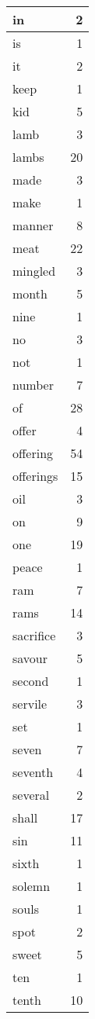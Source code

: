 \begin{center}
\begin{longtable}{l|r}
in & 2\\ \hline 
is & 1\\ \hline 
it & 2\\ \hline 
keep & 1\\ \hline 
kid & 5\\ \hline 
lamb & 3\\ \hline 
lambs & 20\\ \hline 
made & 3\\ \hline 
make & 1\\ \hline 
manner & 8\\ \hline 
meat & 22\\ \hline 
mingled & 3\\ \hline 
month & 5\\ \hline 
nine & 1\\ \hline 
no & 3\\ \hline 
not & 1\\ \hline 
number & 7\\ \hline 
of & 28\\ \hline 
offer & 4\\ \hline 
offering & 54\\ \hline 
offerings & 15\\ \hline 
oil & 3\\ \hline 
on & 9\\ \hline 
one & 19\\ \hline 
peace & 1\\ \hline 
ram & 7\\ \hline 
rams & 14\\ \hline 
sacrifice & 3\\ \hline 
savour & 5\\ \hline 
second & 1\\ \hline 
servile & 3\\ \hline 
set & 1\\ \hline 
seven & 7\\ \hline 
seventh & 4\\ \hline 
several & 2\\ \hline 
shall & 17\\ \hline 
sin & 11\\ \hline 
sixth & 1\\ \hline 
solemn & 1\\ \hline 
souls & 1\\ \hline 
spot & 2\\ \hline 
sweet & 5\\ \hline 
ten & 1\\ \hline 
tenth & 10\\ \hline 

\end{longtable}
\end{center}
